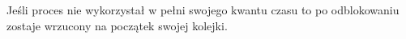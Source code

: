 Jeśli proces nie wykorzystał w pełni swojego kwantu czasu to po odblokowaniu zostaje wrzucony na początek swojej kolejki.